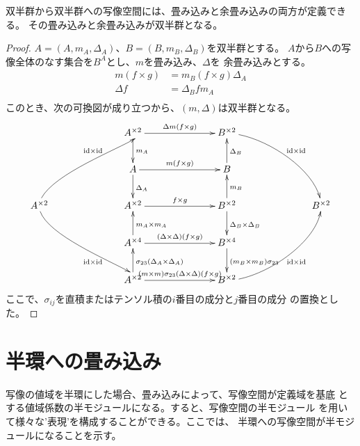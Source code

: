 	\begin{proposition}[畳み込みと余畳み込み]\label{prop:畳み込みと余畳み込み} %
		双半群から双半群への写像空間には、畳み込みと余畳み込みの両方が定義できる。
		その畳み込みと余畳み込みが双半群となる。
	\end{proposition} %
	\begin{proof} %
		$A=(A,m_A,\Delta_A)$、$B=(B,m_B,\Delta_B)$を双半群とする。
		$A$から$B$への写像全体のなす集合を$B^A$とし、$m$を畳み込み、$\Delta$を
		余畳み込みとする。
		\begin{equation*}\begin{split} %
			m(f\times g) &= m_B(f\times g)\Delta_A \\
			\Delta f &= \Delta_B f m_A \\
		\end{split}\end{equation*} %
		このとき、次の可換図が成り立つから、$(m,\Delta)$は双半群となる。
		\begin{equation}\xymatrix@C+4pc{
			& A^{\times 2} \ar[d]^{m_A} \ar[r]^{\Delta m(f\times g)} 
			& B^{\times 2} \ar@(r,u)[rdd]^{\myid\times \myid} \\ 
			& A \ar[d]^{\Delta_A} \ar[r]^{m(f\times g)} & B \ar[u]_{\Delta_B} \\ 
			A^{\times 2} \ar@(u,r)[ruu]^{\myid\times \myid} \ar@(d,r)[rdd]_{\myid\times \myid}
			& A^{\times 2} \ar[r]^{f\times g} 
			& B^{\times 2} \ar[u]_{m_B} \ar[d]^{\Delta_B\times \Delta_B}
			& B^{\times 2} \\
			& A^{\times 4} \ar[u]_{m_A\times m_A} \ar[r]^{(\Delta\times \Delta)(f\times g)} & B^{\times 4} \ar[d]^{(m_B\times m_B)\sigma_{23}} \\
			& A^{\times 2} \ar[u]_{\sigma_{23}(\Delta_A\times \Delta_A)} \ar[r]^{(m\times m)\sigma_{23}(\Delta\times \Delta)(f\times g)} 
			& B^{\times 2} \ar@(r,d)[ruu]_{\myid\times \myid} \\
		}\end{equation}
		ここで、$\sigma_{ij}$を直積またはテンソル積の$i$番目の成分と$j$番目の成分
		の置換とした。
	\end{proof} %

\section{半環への畳み込み}\label{s1:半環への畳み込み} %
	写像の値域を半環にした場合、畳み込みによって、写像空間が定義域を基底
	とする値域係数の半モジュールになる。すると、写像空間の半モジュール
	を用いて様々な'表現'を構成することができる。ここでは、
	半環への写像空間が半モジュールになることを示す。

